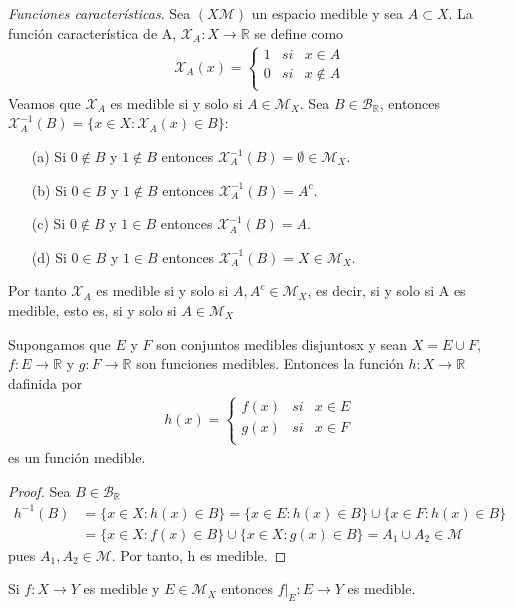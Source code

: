 \begin{ejemplo}
\end{ejemplo}
\textit{Funciones características}. Sea $(X \mathcal{M})$ un espacio medible y sea $A \subset X$. La función característica de A, $\mathcal{X}_A: X \longrightarrow \mathbb{R}$ se define como
\begin{align*}
    \mathcal{X}_A(x) =  \left\{ \begin{array}{lcc}
             1 &  si  &x \in A\\
             0 &  si &x \not \in A \\
             \end{array}
   \right.
\end{align*}
Veamos que $\mathcal{X}_A$ es medible si y solo si $A \in \mathcal{M}_X$. Sea $B \in \mathcal{B}_{\mathbb{R}}$, entonces $\mathcal{X}_{A}^{-1}(B) = \{ x \in X : \mathcal{X}_A(x) \in B \}$:
\begin{enumerate}
    \item[(a)] Si $0 \not \in B$ y $1 \not \in B$ entonces $\mathcal{X}_{A}^{-1}(B) = \emptyset \in \mathcal{M}_X$.
    \item[(b)] Si $0 \in B$ y $1 \not \in B$ entonces $\mathcal{X}_{A}^{-1}(B) = A^c$.
    \item[(c)] Si $0 \not \in B$ y $1 \in B$ entonces $\mathcal{X}_{A}^{-1}(B) = A$.
    \item[(d)] Si $0 \in B$ y $1 \in B$ entonces $\mathcal{X}_{A}^{-1}(B) = X \in \mathcal{M}_X$.
\end{enumerate}
Por tanto $\mathcal{X}_A$ es medible si y solo si $A, A^c \in \mathcal{M}_X$, es decir, si y solo si A es medible, esto es, si y solo si $A \in \mathcal{M}_X$

\begin{prop}
Supongamos que $E$ y $F$ son conjuntos medibles disjuntosx y sean $X = E \cup F$, $f: E \longrightarrow \mathbb{R}$ y $g: F \longrightarrow \mathbb{R}$ son funciones medibles. Entonces la función $h: X \longrightarrow \mathbb{R}$ dafinida por
\begin{align*}
    h(x) =  \left\{ \begin{array}{lcc}
             f(x) &  si  &x \in E\\
             g(x) &  si  &x \in F \\
             \end{array}
   \right.
\end{align*}
es un función medible.
\end{prop}
\begin{proof}
Sea $B \in \mathcal{B}_{\mathbb{R}}$
\begin{align*}
    h^{-1}(B) &= \{ x \in X : h(x)  \in B\} = \{ x \in E : h(x) \in B\} \cup \{ x \in F : h(x) \in B\}\\
    &= \{ x \in X : f(x) \in B\} \cup \{ x \in X : g(x) \in B\} = A_1 \cup A_2 \in \mathcal{M}
\end{align*}
pues $A_1, A_2 \in \mathcal{M}$. Por tanto, h es medible.
\end{proof}
\begin{obs}
Si $f: X \longrightarrow Y$ es medible y $E \in \mathcal{M}_X$ entonces $f|_E: E \longrightarrow Y$ es medible.
\end{obs}
